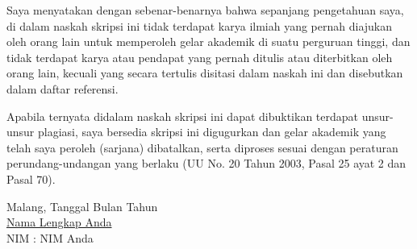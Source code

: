 \documentclass{skripsi}
\newif\ifpendahuluansaja
\begin{document}
\ifpendahuluansaja\else

\cover

\approvalpage

{\orisinalitas

  Saya menyatakan dengan sebenar-benarnya bahwa sepanjang pengetahuan
  saya, di dalam naskah skripsi ini tidak terdapat karya ilmiah yang
  pernah diajukan oleh orang lain untuk memperoleh gelar akademik di
  suatu perguruan tinggi, dan tidak terdapat karya atau pendapat yang
  pernah ditulis atau diterbitkan oleh orang lain, kecuali yang secara
  tertulis disitasi dalam naskah ini dan disebutkan dalam daftar
  referensi.

  Apabila ternyata didalam naskah skripsi ini dapat dibuktikan
  terdapat unsur-unsur plagiasi, saya bersedia skripsi ini digugurkan
  dan gelar akademik yang telah saya peroleh (sarjana) dibatalkan,
  serta diproses sesuai dengan peraturan perundang-undangan yang
  berlaku (UU No. 20 Tahun 2003, Pasal 25 ayat 2 dan Pasal 70).
  \vspace{1.5cm}

  \noindent
  \hspace*{8cm}Malang, Tanggal Bulan Tahun   \vspace{2.5cm}   \\

  \hspace*{7cm}\underline{Nama Lengkap Anda} \\
  \hspace*{8cm}NIM : NIM Anda
}
\end{document}
